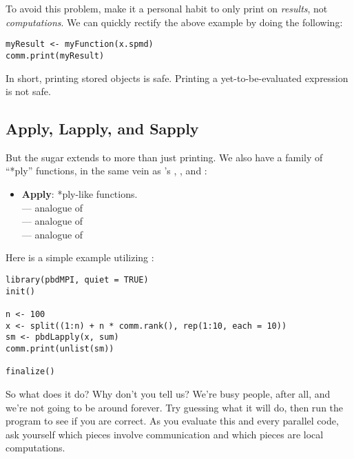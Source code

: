 To avoid this problem, make it a personal habit to only print on
\emph{results}, not \emph{computations}. We can quickly rectify the above
example by doing the following:
\begin{lstlisting}[language=rr,title=A Cautionary Tale of Printing in Parallel (3 of 3)]
myResult <- myFunction(x.spmd)
comm.print(myResult)
\end{lstlisting}

In short, printing stored objects is safe. Printing a yet-to-be-evaluated
expression is not safe.





\subsection{Apply, Lapply, and Sapply}\label{sec:pbdsugar2}

But the  sugar extends to more than just printing. We also have a
family of ``*ply'' functions, in the same vein as 's
, , and :
\begin{itemize}
  \item \textbf{Apply}: *ply-like functions.\\
   --- analogue of \\
   --- analogue of \\
   --- analogue of \\
\end{itemize}

Here is a simple example utilizing :
    
\begin{lstlisting}[language=rr,title=Example 4]
library(pbdMPI, quiet = TRUE)
init()

n <- 100
x <- split((1:n) + n * comm.rank(), rep(1:10, each = 10))
sm <- pbdLapply(x, sum)
comm.print(unlist(sm))

finalize()
\end{lstlisting}

So what does it do? Why don't you tell us? We're busy people, after all,
and we're not going to be around forever. Try guessing what it will do,
then run the program to see if you are correct. As you evaluate this and
every parallel code, ask yourself which pieces involve communication and
which pieces are local computations.





